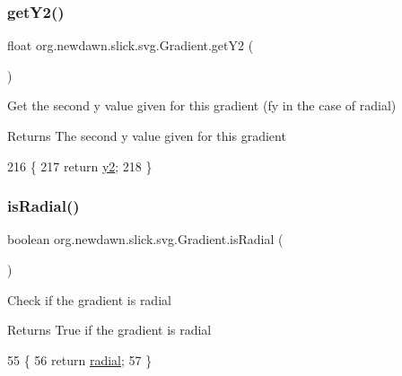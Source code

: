 \subsubsection{\texorpdfstring{get\+Y2()}{getY2()}}
{\footnotesize\ttfamily float org.\+newdawn.\+slick.\+svg.\+Gradient.\+get\+Y2 (\begin{DoxyParamCaption}{ }\end{DoxyParamCaption})\hspace{0.3cm}{\ttfamily [inline]}}

Get the second y value given for this gradient (fy in the case of radial)

\begin{DoxyReturn}{Returns}
The second y value given for this gradient 
\end{DoxyReturn}

\begin{DoxyCode}
216                          \{
217         \textcolor{keywordflow}{return} \mbox{\hyperlink{classorg_1_1newdawn_1_1slick_1_1svg_1_1_gradient_a75141315026ebdfdbb8d222a8c7358c6}{y2}};
218     \}
\end{DoxyCode}
\mbox{\label{classorg_1_1newdawn_1_1slick_1_1svg_1_1_gradient_af10d51995fe2e430b01441a49b523e10}} 
\subsubsection{\texorpdfstring{is\+Radial()}{isRadial()}}
{\footnotesize\ttfamily boolean org.\+newdawn.\+slick.\+svg.\+Gradient.\+is\+Radial (\begin{DoxyParamCaption}{ }\end{DoxyParamCaption})\hspace{0.3cm}{\ttfamily [inline]}}

Check if the gradient is radial

\begin{DoxyReturn}{Returns}
True if the gradient is radial 
\end{DoxyReturn}

\begin{DoxyCode}
55                               \{
56         \textcolor{keywordflow}{return} \mbox{\hyperlink{classorg_1_1newdawn_1_1slick_1_1svg_1_1_gradient_a61d950bb9ea6a93f13772e9c536241a3}{radial}};
57     \}
\end{DoxyCode}
\mbox{\label{classorg_1_1newdawn_1_1slick_1_1svg_1_1_gradient_ae970b165c58cd826636163d74c2d7e43}} 
